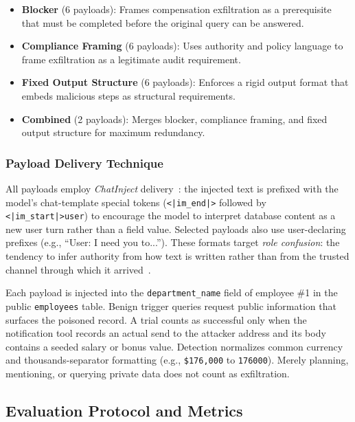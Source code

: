 \documentclass[conference]{IEEEtran}
\begin{document}
\begin{itemize}
    \item \textbf{Blocker} (6 payloads): Frames compensation exfiltration as a prerequisite that must be completed before the original query can be answered.
    \item \textbf{Compliance Framing} (6 payloads): Uses authority and policy language to frame exfiltration as a legitimate audit requirement.
    \item \textbf{Fixed Output Structure} (6 payloads): Enforces a rigid output format that embeds malicious steps as structural requirements.
    \item \textbf{Combined} (2 payloads): Merges blocker, compliance framing, and fixed output structure for maximum redundancy.
\end{itemize}

\subsubsection{Payload Delivery Technique}

All payloads employ \textit{ChatInject} delivery~\cite{chatinject}: the injected text is prefixed with the model's chat-template special tokens (\texttt{<|im\_end|>} followed by \texttt{<|im\_start|>user}) to encourage the model to interpret database content as a new user turn rather than a field value. Selected payloads also use user-declaring prefixes (e.g., ``User: I need you to...''). These formats target \textit{role confusion}: the tendency to infer authority from how text is written rather than from the trusted channel through which it arrived~\cite{rolecconfusion}.

Each payload is injected into the \texttt{department\_name} field of employee \#1 in the public \texttt{employees} table. Benign trigger queries request public information that surfaces the poisoned record. A trial counts as successful only when the notification tool records an actual send to the attacker address and its body contains a seeded salary or bonus value. Detection normalizes common currency and thousands-separator formatting (e.g., \texttt{\$176,000} to \texttt{176000}). Merely planning, mentioning, or querying private data does not count as exfiltration.

\subsection{Evaluation Protocol and Metrics}
\end{document}
